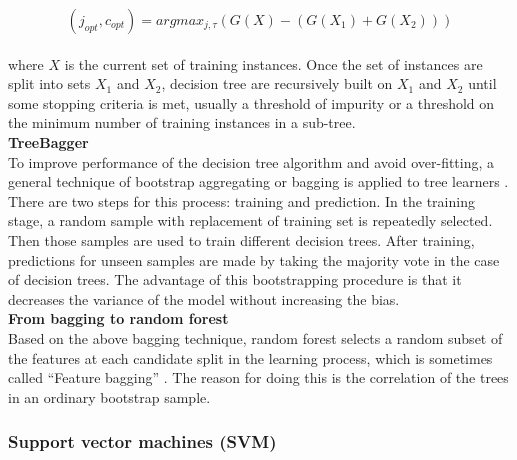 \begin{equation}
(j_{opt}, c_{opt}) = argmax_{j,\tau}(G(X)-(G(X_1 )+G(X_2)))
\end{equation}
\\
where $X$ is the current set of training instances. Once the set of instances are split into sets $X_{1}$ and $X_{2}$, decision tree are recursively built on  $X_{1}$ and $X_{2}$ until some stopping criteria is met, usually a threshold of impurity or a threshold  on the minimum number of training instances in a sub-tree. 
\\
\textbf{TreeBagger}
\\
To improve performance of the decision tree algorithm and avoid over-fitting, a general technique of bootstrap aggregating or bagging is applied to tree learners \citep{breiman1996bagging}. There are two steps for this process: training and prediction.
In the training stage, a random sample with replacement of training set is repeatedly selected. Then those samples are used to train different decision trees. After training, predictions for unseen samples are made by taking the majority vote in the case of decision trees. The advantage of this bootstrapping procedure is that it decreases the variance of the model without increasing the bias.
\\
\textbf{From bagging to random forest}
\\
Based on the above bagging technique, random forest selects a random subset of the features at each candidate split in the learning process, which is sometimes called “Feature bagging” \citep{ho1995random}. The reason for doing this is the correlation of the trees in an ordinary bootstrap sample.


\subsubsection{Support vector machines (SVM)}


